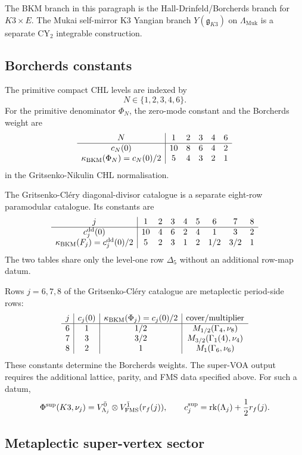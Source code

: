 The BKM branch in this paragraph is the Hall-Drinfeld/Borcherds branch
for \(K3\times E\). The Mukai self-mirror K3 Yangian branch
\(Y(\mathfrak g_{K3})\) on \(\Lambda_{\mathrm{Muk}}\) is a separate
CY\(_2\) integrable construction.

\subsection*{Borcherds constants}

The primitive compact CHL levels are indexed by
\[
  N\in\{1,2,3,4,6\}.
\]
For the primitive denominator \(\Phi_N\), the zero-mode constant and
the Borcherds weight are
\[
\begin{array}{c|ccccc}
N&1&2&3&4&6\\
\hline
c_N(0)&10&8&6&4&2\\
\kappa_{\mathrm{BKM}}(\Phi_N)=c_N(0)/2&5&4&3&2&1
\end{array}
\]
in the Gritsenko-Nikulin CHL normalisation.

The Gritsenko-Cl\'ery diagonal-divisor catalogue is a separate
eight-row paramodular catalogue. Its constants are
\[
\begin{array}{c|cccccccc}
j&1&2&3&4&5&6&7&8\\
\hline
c_j^{\mathrm{dd}}(0)&10&4&6&2&4&1&3&2\\
\kappa_{\mathrm{BKM}}(F_j)=c_j^{\mathrm{dd}}(0)/2&5&2&3&1&2&1/2&3/2&1
\end{array}
\]
The two tables share only the level-one row \(\Delta_5\) without an
additional row-map datum.

Rows \(j=6,7,8\) of the Gritsenko-Cl\'ery catalogue are metaplectic
period-side rows:
\[
\begin{array}{c|c|c|c}
j & c_j(0) & \kappa_{\mathrm{BKM}}(\Phi_j)=c_j(0)/2 & \text{cover/multiplier} \\
\hline
6 & 1 & 1/2 & M_{1/2}(\Gamma_4,\nu_8) \\
7 & 3 & 3/2 & M_{3/2}(\Gamma_1(4),\nu_4) \\
8 & 2 & 1 & M_{1}(\Gamma_6,\nu_6)
\end{array}
\]
These constants determine the Borcherds weights. The super-VOA output
requires the additional lattice, parity, and FMS data specified above.
For such a datum,
\[
  \Phi^{\mathrm{sup}}(K3,\nu_j)
  =
  V_{\Lambda_j}^{\bar 0}
  \otimes
  V_{\mathrm{FMS}}^{\bar 1}(r_f(j)),
  \qquad
  c^{\mathrm{sup}}_j=\mathrm{rk}(\Lambda_j)+\frac12 r_f(j).
\]

\subsection*{Metaplectic super-vertex sector}

